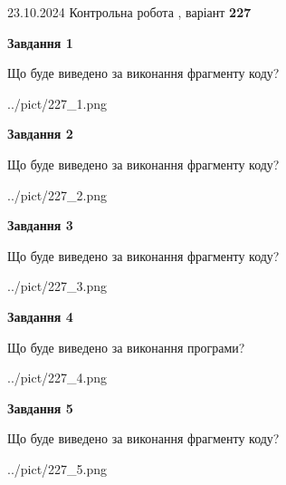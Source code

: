 \documentclass[12pt, ukrainian]{article}
\begin{document}
{\Large{23.10.2024 Контрольна робота , варіант  \No \textbf { 227 }\par}}
{
\begin {large}
{\begin {center}\textbf{Завдання 1}\end {center}}

Що буде виведено за виконання фрагменту коду?\par
\begin{center}
	{../pict/227_1.png}
\end{center}
\newpage

{\begin {center}\textbf{Завдання 2}\end {center}}

Що буде виведено за виконання фрагменту коду?\par
\begin{center}
	{../pict/227_2.png}
\end{center}
\newpage

{\begin {center}\textbf{Завдання 3}\end {center}}

Що буде виведено за виконання фрагменту коду?\par
\begin{center}
	{../pict/227_3.png}
\end{center}
\newpage

{\begin {center}\textbf{Завдання 4}\end {center}}

Що буде виведено за виконання програми?\par
\begin{center}
	{../pict/227_4.png}
\end{center}
\newpage

{\begin {center}\textbf{Завдання 5}\end {center}}

Що буде виведено за виконання фрагменту коду?\par
\begin{center}
	{../pict/227_5.png}
\end{center}
\newpage


\end{large}}
\end{document}
